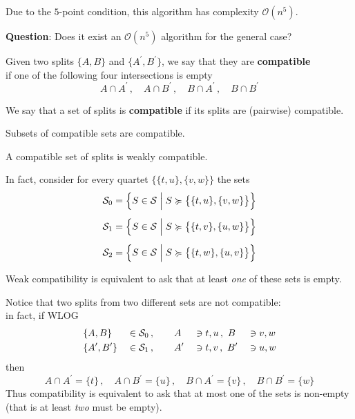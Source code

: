 \documentclass[./main.tex]{subfiles}
\begin{document}
Due to the $5$-point condition, this algorithm has complexity $\mathcal{O}(n^5)$.

\textbf{Question}: Does it exist an $\mathcal{O}(n^5)$ algorithm for the general case?


\vspace{\baselineskip} \Hrule
\clearpage

\begin{definition}[compatibility]
    Given two splits $\{A,B\}$ and $\{A^\prime,B^\prime\}$, we say that they are \textbf{compatible} \\[1pt]
    \bsp if one of the following four intersections is empty
    \[ A \cap A^\prime \,, \quad A \cap B^\prime \,, \quad B \cap A^\prime \,, \quad B \cap B^\prime \]

    We say that a set of splits is \textbf{compatible} if its splits are (pairwise) compatible.
\end{definition}

\begin{remark}
    Subsets of compatible sets are compatible.
\end{remark}

\begin{remark}
    A compatible set of splits is weakly compatible. \bigskip

    In fact, consider for every quartet $\bigl\{ \{t,u\},\{v,w\} \bigr\}$ the sets
    \begin{align*}
        {\mathcal{S}}_0 &= \Bigl\{ S \in {\mathcal{S}} \mathrel{\Big|} S \succcurlyeq \bigl\{ \{t,u\},\{v,w\} \bigr\} \Bigr\} \\[5pt]
        {\mathcal{S}}_1 &= \Bigl\{ S \in {\mathcal{S}} \mathrel{\Big|} S \succcurlyeq \bigl\{ \{t,v\},\{u,w\} \bigr\} \Bigr\} \\[5pt]
        {\mathcal{S}}_2 &= \Bigl\{ S \in {\mathcal{S}} \mathrel{\Big|} S \succcurlyeq \bigl\{ \{t,w\},\{u,v\} \bigr\} \Bigr\}
    \end{align*}

    Weak compatibility is equivalent to ask that at least \textit{one} of these sets is empty. \medskip

    Notice that two splits from two different sets are not compatible: \\
    in fact, if WLOG
    \begingroup \nospblw
    \begin{alignat*}{4}
        &\{A,B\} &&\in {\mathcal{S}}_0 \,, \qquad A &&\ni t,u \,,\ B &&\ni v,w \\
        &\{A^\prime,B^\prime\} &&\in {\mathcal{S}}_1 \,, \qquad A^\prime &&\ni t,v \,,\ B^\prime &&\ni u,w
    \end{alignat*}
    \endgroup
    then
    \[ A \cap A^\prime = \{t\} \,, \quad A \cap B^\prime = \{u\} \,, \quad B \cap A^\prime = \{v\} \,, \quad B \cap B^\prime = \{w\} \]
    Thus compatibility is equivalent to ask that at most one of the sets is non-empty (that is at least \textit{two} must be empty).
\end{remark}
\end{document}

